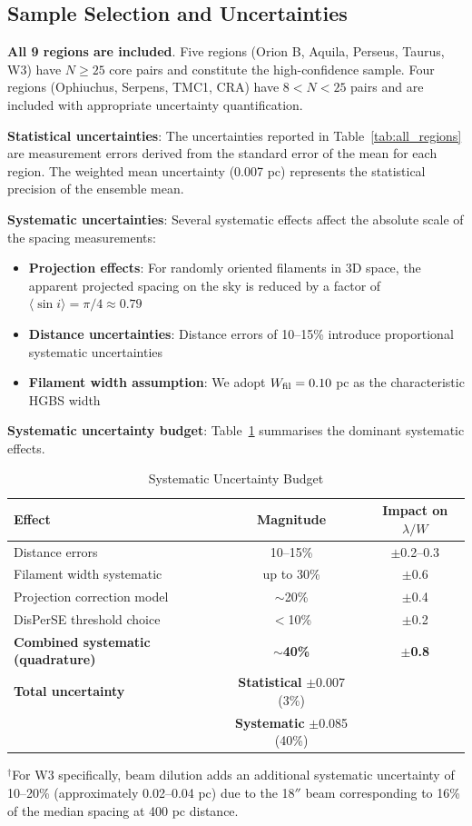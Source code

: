 \documentclass[11pt,a4paper]{article}
\begin{document}
\subsection{Sample Selection and Uncertainties}

\textbf{All 9 regions are included}. Five regions (Orion B, Aquila, Perseus, Taurus, W3) have $N \geq 25$ core pairs and constitute the high-confidence sample. Four regions (Ophiuchus, Serpens, TMC1, CRA) have $8 < N < 25$ pairs and are included with appropriate uncertainty quantification.

\textbf{Statistical uncertainties}: The uncertainties reported in Table~\ref{tab:all_regions} are measurement errors derived from the standard error of the mean for each region. The weighted mean uncertainty (0.007 pc) represents the statistical precision of the ensemble mean.

\textbf{Systematic uncertainties}: Several systematic effects affect the absolute scale of the spacing measurements:
\begin{itemize}
    \item \textbf{Projection effects}: For randomly oriented filaments in 3D space, the apparent projected spacing on the sky is reduced by a factor of $\langle \sin i \rangle = \pi/4 \approx 0.79$
    \item \textbf{Distance uncertainties}: Distance errors of 10--15\% introduce proportional systematic uncertainties
    \item \textbf{Filament width assumption}: We adopt $W_{\rm fil} = 0.10$ pc as the characteristic HGBS width \citep{Arzoumanian2011}
\end{itemize}

\textbf{Systematic uncertainty budget}: Table~\ref{tab:uncertainties} summarises the dominant systematic effects.

\begin{table}[H]
\centering
\caption{Systematic Uncertainty Budget}
\label{tab:uncertainties}
\begin{tabular}{lcc}
\toprule
Effect & Magnitude & Impact on $\lambda/W$ \\
\midrule
Distance errors & 10--15\% & $\pm$0.2--0.3 \\
Filament width systematic & up to 30\% & $\pm$0.6 \\
Projection correction model & $\sim$20\% & $\pm$0.4 \\
DisPerSE threshold choice & $<$10\% & $\pm$0.2 \\
\textbf{Combined systematic (quadrature)} & \textbf{$\sim$40\%} & \textbf{$\pm$0.8} \\
\midrule
\textbf{Total uncertainty} & \textbf{Statistical} $\pm$0.007 (3\%) & \\
& \textbf{Systematic} $\pm$0.085 (40\%) & \\
\bottomrule
\end{tabular}
\vspace{-0.5em}
\small{$^{\dagger}$For W3 specifically, beam dilution adds an additional systematic uncertainty of 10--20\% (approximately 0.02--0.04 pc) due to the 18$''$ beam corresponding to 16\% of the median spacing at 400 pc distance.}
\end{table}
\end{document}
